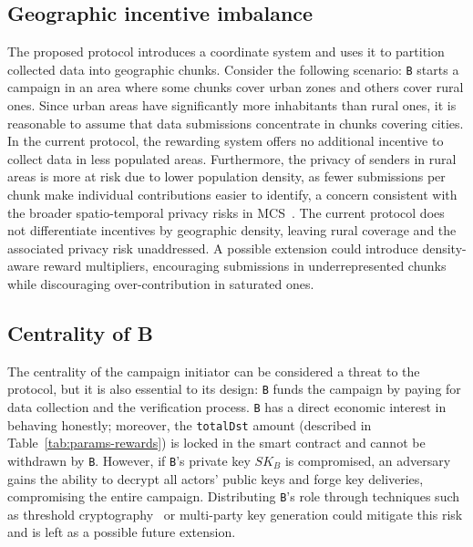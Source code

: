 \subsection{Geographic incentive imbalance}\label{subsec:security-analysis-issues-unused-geography}
The proposed protocol introduces a coordinate system and uses it to partition collected data into geographic chunks.
Consider the following scenario: \texttt{B} starts a campaign in an area where some chunks cover urban zones and others cover rural ones.
Since urban areas have significantly more inhabitants than rural ones, it is reasonable to assume that data submissions concentrate in chunks covering cities.
In the current protocol, the rewarding system offers no additional incentive to collect data in less populated areas.
Furthermore, the privacy of senders in rural areas is more at risk due to lower population density, as fewer submissions per chunk make individual contributions easier to identify,
a concern consistent with the broader spatio-temporal privacy risks in MCS~\cite{montori2023privacy}.
The current protocol does not differentiate incentives by geographic density, leaving rural coverage and the associated privacy risk unaddressed.
A possible extension could introduce density-aware reward multipliers, encouraging submissions in underrepresented chunks while discouraging over-contribution in saturated ones.

\subsection{Centrality of B}\label{subsec:security-analysis-issues-centrality-b}
The centrality of the campaign initiator can be considered a threat to the protocol, but it is also essential to its design: \texttt{B} funds the campaign by paying for data collection and the verification process.
\texttt{B} has a direct economic interest in behaving honestly; moreover, the \texttt{totalDst} amount (described in Table~\ref{tab:params-rewards}) is locked in the smart contract and cannot be withdrawn by \texttt{B}.
However, if \texttt{B}'s private key $SK_B$ is compromised, an adversary gains the ability to decrypt all actors' public keys and forge key deliveries, compromising the entire campaign.
Distributing \texttt{B}'s role through techniques such as threshold cryptography~\cite{shamir1979share} or multi-party key generation could mitigate this risk and is left as a possible future extension.

